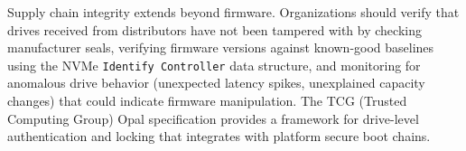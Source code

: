\begin{securitybox}
Supply chain integrity extends beyond firmware. Organizations should verify that drives received from distributors have not been tampered with by checking manufacturer seals, verifying firmware versions against known-good baselines using the NVMe \texttt{Identify Controller} data structure, and monitoring for anomalous drive behavior (unexpected latency spikes, unexplained capacity changes) that could indicate firmware manipulation. The TCG (Trusted Computing Group) Opal specification provides a framework for drive-level authentication and locking that integrates with platform secure boot chains.

\end{securitybox}
